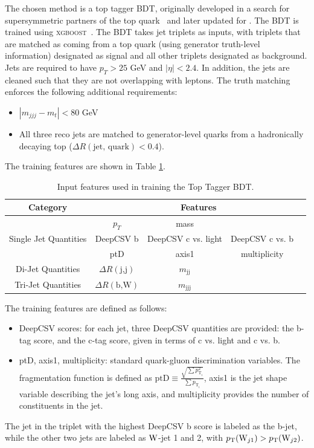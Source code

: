 The chosen method is a top tagger BDT, originally developed in a search for supersymmetric partners of the top quark~\cite{stop_search} and later updated for \ttH.
The BDT is trained using \textsc{xgboost}~\cite{xgboost}.
The BDT takes jet triplets as inputs, with triplets that are matched as coming from a top quark (using generator truth-level information) designated as signal and all other triplets designated as background.
Jets are required to have $p_T > 25$ GeV and $|\eta| < 2.4$.
In addition, the jets are cleaned such that they are not overlapping with leptons.
The truth matching enforces the following additional requirements:
\begin{itemize}
    \item $|m_{jjj} - m_t| < 80$ GeV
    \item All three reco jets are matched to generator-level quarks from a hadronically decaying top ($\Delta R(\text{jet, quark}) < 0.4$).
\end{itemize}
The training features are shown in Table \ref{tab:tth_top_tagger_features}.
\begin{table}
	\centering
	\begin{tabular}{c |c c c c} \hline \hline
		Category & \multicolumn{4}{c}{Features} \\ \hline
		\multirow{3}{*}{Single Jet Quantities} & $p_T$ & mass & & \\
		& DeepCSV b & DeepCSV c vs. light & DeepCSV c vs. b & \\
		& ptD & axis1 & multiplicity & \\ \hline
		\multirow{1}{*}{Di-Jet Quantities} & $\Delta R(\text{j,j})$ & $m_{\text{jj}}$ & & \\
		\multirow{1}{*}{Tri-Jet Quantities} & $\Delta R(\text{b,W})$ & $m_{\text{jjj}}$ & &  \\ \hline \hline
	\end{tabular}
    \caption{Input features used in training the Top Tagger BDT.}
    \label{tab:tth_top_tagger_features}
\end{table}
The training features are defined as follows:
\begin{itemize}
    \item DeepCSV scores: for each jet, three DeepCSV quantities are provided: the b-tag score, and the c-tag score, given in terms of c vs. light and c vs. b.
    \item ptD, axis1, multiplicity: standard quark-gluon discrimination variables. The fragmentation function is defined as $\text{ptD} \equiv \frac{\sqrt{\sum p_{\text{T}_i}^2}}{\sum p_{\text{T}_i}}$, axis1 is the jet shape variable describing the jet's long axis, and multiplicity provides the number of constituents in the jet.
\end{itemize}
The jet in the triplet with the highest DeepCSV b score is labeled as the b-jet, while the other two jets are labeled as $\mathrm{W}$-jet 1 and 2, with $p_{\mathrm{T}}(\mathrm{W}_{j1}) > p_{\mathrm{T}}(\mathrm{W}_{j2})$.

